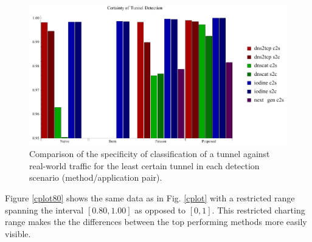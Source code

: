 \documentclass{llncs}
\begin{document}
\begin{figure}[h]
\centering
\includegraphics[width=\textwidth]{../figures/cplot3.pdf}
\caption[Chart of Specificity of Detection by Tunnel Application and Detection
Method]{Comparison of the specificity of classification of a tunnel against
real-world traffic for the least certain tunnel in each detection scenario
(method/application pair).}
\label{cplot95}
\end{figure}



Figure \ref{cplot80} shows the same data as in Fig. \ref{cplot} with a
restricted range spanning the interval $[0.80,1.00]$ as opposed to $[0,1]$. This
restricted charting range makes the the differences between the top performing
methods more easily visible.
\end{document}
